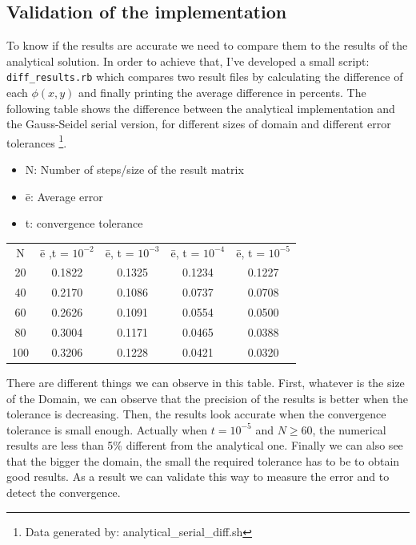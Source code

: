 \documentclass[a4paper,11pt]{article}
\begin{document}
\subsection{Validation of the implementation}

To know if the results are accurate we need to compare them to the results of the analytical solution. In order to
achieve that, I've developed a small script: \texttt{diff\_results.rb} which compares two result files by calculating the
difference of each $\phi(x,y)$ and finally printing the average difference in percents. The following table shows the difference
between the analytical implementation and the Gauss-Seidel serial version, for different sizes of domain and different error tolerances
\footnote{Data generated by: analytical\_serial\_diff.sh}.


\begin{itemize}
\item{N: Number of steps/size of the result matrix}
\item{\=e: Average error}
\item{t: convergence tolerance}
\end{itemize}

\begin{center}
\vspace{1em}
\begin{tabular}{c | c | c | c | c}
N & \=e ,t = $10^{-2}$ & \=e, t = $10^{-3}$ & \=e, t = $10^{-4}$ & \=e, t = $10^{-5}$ \\
20 & 0.1822 & 0.1325 & 0.1234 & 0.1227 \\
40 & 0.2170 & 0.1086 & 0.0737 & 0.0708 \\
60 & 0.2626 & 0.1091 & 0.0554 & 0.0500 \\
80 & 0.3004 & 0.1171 & 0.0465 & 0.0388 \\
100 & 0.3206 & 0.1228 & 0.0421 & 0.0320 \\
\end{tabular}
\end{center}

There are different things we can observe in this table. First, whatever is the size of the Domain, we can observe that
the precision of the results is better when the tolerance is decreasing. Then, the results look accurate when the 
convergence tolerance is small enough. Actually when $t = 10^{-5}$ and $N \geq 60$, the numerical results are less
than 5\% different from the analytical one. Finally we can also see that the bigger the domain, the small the required
tolerance has to be to obtain good results. As a result we can validate this way to measure the error and to detect the
convergence.
\end{document}
